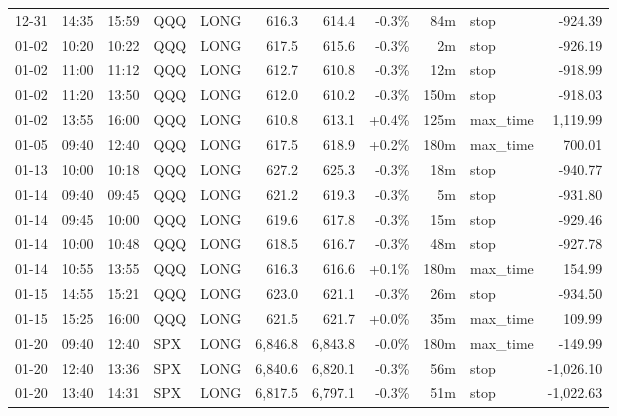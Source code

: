 \documentclass[11pt,a4paper,twoside]{article}
\begin{document}
\begin{center}
\begin{longtable}{>{\color{txtmain}}l l l l l r r r r >{\color{txtmain}}l r}
12-31 & 14:35 & 15:59 & QQQ & LONG & 616.3 & 614.4 & \textcolor{lossred}{-0.3\%} & 84m & stop & \textcolor{lossred}{-924.39} \\
01-02 & 10:20 & 10:22 & QQQ & LONG & 617.5 & 615.6 & \textcolor{lossred}{-0.3\%} & 2m & stop & \textcolor{lossred}{-926.19} \\
01-02 & 11:00 & 11:12 & QQQ & LONG & 612.7 & 610.8 & \textcolor{lossred}{-0.3\%} & 12m & stop & \textcolor{lossred}{-918.99} \\
01-02 & 11:20 & 13:50 & QQQ & LONG & 612.0 & 610.2 & \textcolor{lossred}{-0.3\%} & 150m & stop & \textcolor{lossred}{-918.03} \\
01-02 & 13:55 & 16:00 & QQQ & LONG & 610.8 & 613.1 & \textcolor{wingreen}{+0.4\%} & 125m & max\_time & \textcolor{wingreen}{1,119.99} \\
01-05 & 09:40 & 12:40 & QQQ & LONG & 617.5 & 618.9 & \textcolor{wingreen}{+0.2\%} & 180m & max\_time & \textcolor{wingreen}{700.01} \\
01-13 & 10:00 & 10:18 & QQQ & LONG & 627.2 & 625.3 & \textcolor{lossred}{-0.3\%} & 18m & stop & \textcolor{lossred}{-940.77} \\
01-14 & 09:40 & 09:45 & QQQ & LONG & 621.2 & 619.3 & \textcolor{lossred}{-0.3\%} & 5m & stop & \textcolor{lossred}{-931.80} \\
01-14 & 09:45 & 10:00 & QQQ & LONG & 619.6 & 617.8 & \textcolor{lossred}{-0.3\%} & 15m & stop & \textcolor{lossred}{-929.46} \\
01-14 & 10:00 & 10:48 & QQQ & LONG & 618.5 & 616.7 & \textcolor{lossred}{-0.3\%} & 48m & stop & \textcolor{lossred}{-927.78} \\
01-14 & 10:55 & 13:55 & QQQ & LONG & 616.3 & 616.6 & \textcolor{wingreen}{+0.1\%} & 180m & max\_time & \textcolor{wingreen}{154.99} \\
01-15 & 14:55 & 15:21 & QQQ & LONG & 623.0 & 621.1 & \textcolor{lossred}{-0.3\%} & 26m & stop & \textcolor{lossred}{-934.50} \\
01-15 & 15:25 & 16:00 & QQQ & LONG & 621.5 & 621.7 & \textcolor{wingreen}{+0.0\%} & 35m & max\_time & \textcolor{wingreen}{109.99} \\
01-20 & 09:40 & 12:40 & SPX & LONG & 6,846.8 & 6,843.8 & \textcolor{lossred}{-0.0\%} & 180m & max\_time & \textcolor{lossred}{-149.99} \\
01-20 & 12:40 & 13:36 & SPX & LONG & 6,840.6 & 6,820.1 & \textcolor{lossred}{-0.3\%} & 56m & stop & \textcolor{lossred}{-1,026.10} \\
01-20 & 13:40 & 14:31 & SPX & LONG & 6,817.5 & 6,797.1 & \textcolor{lossred}{-0.3\%} & 51m & stop & \textcolor{lossred}{-1,022.63} \\

\end{longtable}
\end{center}
\end{document}
